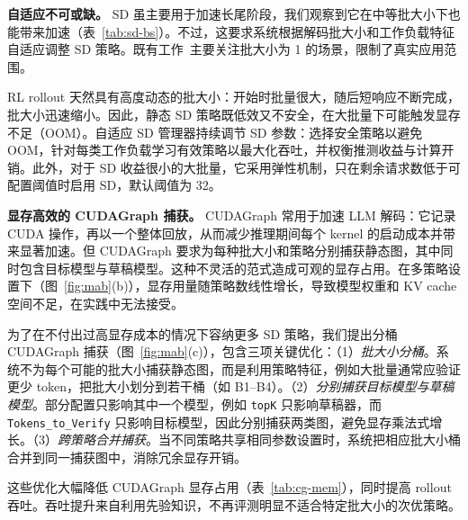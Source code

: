 \documentclass[10pt,twocolumn]{article}
\begin{document}
\noindent\textbf{自适应不可或缺。}
SD 虽主要用于加速长尾阶段，我们观察到它在中等批大小下也能带来加速（表~\ref{tab:sd-bs}）。不过，这要求系统根据解码批大小和工作负载特征自适应调整 SD 策略。既有工作~\cite{Eagle1,Eagle2,HASS}主要关注批大小为 1 的场景，限制了真实应用范围。

RL rollout 天然具有高度动态的批大小：开始时批量很大，随后短响应不断完成，批大小迅速缩小。因此，静态 SD 策略既低效又不安全，在大批量下可能触发显存不足（OOM）。自适应 SD 管理器持续调节 SD 参数：选择安全策略以避免 OOM，针对每类工作负载学习有效策略以最大化吞吐，并权衡推测收益与计算开销。此外，对于 SD 收益很小的大批量，它采用弹性机制，只在剩余请求数低于可配置阈值时启用 SD，默认阈值为 32。

\noindent\textbf{显存高效的 CUDAGraph 捕获。}
CUDAGraph 常用于加速 LLM 解码：它记录 CUDA 操作，再以一个整体回放，从而减少推理期间每个 kernel 的启动成本并带来显著加速。但 CUDAGraph 要求为每种批大小和策略分别捕获静态图，其中同时包含目标模型与草稿模型。这种不灵活的范式造成可观的显存占用。在多策略设置下（图~\ref{fig:mab}(b)），显存用量随策略数线性增长，导致模型权重和 KV cache 空间不足，在实践中无法接受。

为了在不付出过高显存成本的情况下容纳更多 SD 策略，我们提出分桶 CUDAGraph 捕获（图~\ref{fig:mab}(c)），包含三项关键优化：（1）\emph{批大小分桶}。系统不为每个可能的批大小捕获静态图，而是利用策略特征，例如大批量通常应验证更少 token，把批大小划分到若干桶（如 B1--B4）。（2）\emph{分别捕获目标模型与草稿模型}。部分配置只影响其中一个模型，例如 \texttt{topK} 只影响草稿器，而 \texttt{Tokens\_to\_Verify} 只影响目标模型，因此分别捕获两类图，避免显存乘法式增长。（3）\emph{跨策略合并捕获}。当不同策略共享相同参数设置时，系统把相应批大小桶合并到同一捕获图中，消除冗余显存开销。

这些优化大幅降低 CUDAGraph 显存占用（表~\ref{tab:cg-mem}），同时提高 rollout 吞吐。吞吐提升来自利用先验知识，不再评测明显不适合特定批大小的次优策略。
\end{document}
